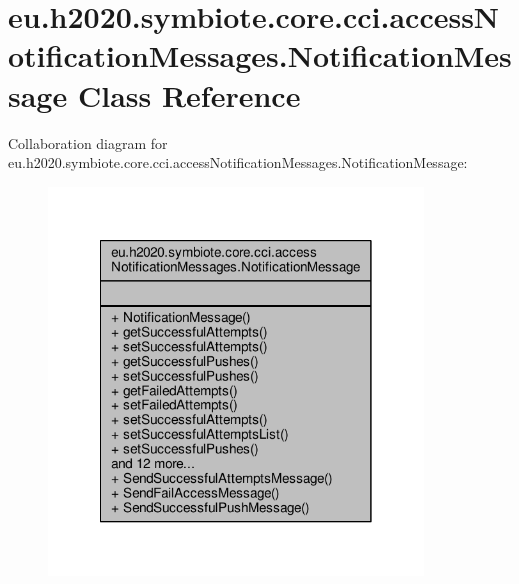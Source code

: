 \hypertarget{classeu_1_1h2020_1_1symbiote_1_1core_1_1cci_1_1accessNotificationMessages_1_1NotificationMessage}{}\section{eu.\+h2020.\+symbiote.\+core.\+cci.\+access\+Notification\+Messages.\+Notification\+Message Class Reference}
\label{classeu_1_1h2020_1_1symbiote_1_1core_1_1cci_1_1accessNotificationMessages_1_1NotificationMessage}


Collaboration diagram for eu.\+h2020.\+symbiote.\+core.\+cci.\+access\+Notification\+Messages.\+Notification\+Message\+:
\nopagebreak
\begin{figure}[H]
\begin{center}
\leavevmode
\includegraphics[width=282pt]{classeu_1_1h2020_1_1symbiote_1_1core_1_1cci_1_1accessNotificationMessages_1_1NotificationMessage__coll__graph}
\end{center}
\end{figure}
